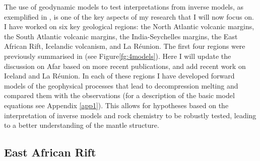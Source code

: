 The use of geodynamic models to test interpretations from inverse models, as exemplified in \cite{goes-etal-2012}, is one of the key aspects of my research that I will now focus on. I have worked on six key geological regions: the North Atlantic volcanic margins, the South Atlantic volcanic margins, the India-Seychelles margins, the East African Rift, Icelandic volcanism, and La Réunion. The first four regions were previously summarised in \cite{armitage-2018} (see Figure\ref{fg:4models}). Here I will update the discussion on Afar based on more recent publications, and add recent work on Iceland and La Réunion. In each of these regions I have developed forward models of the geophysical processes that lead to decompression melting and compared them with the observations (for a description of the basic model equations see Appendix \ref{app1}). This allows for hypotheses based on the interpretation of inverse models and rock chemistry to be robustly tested, leading to a better understanding of the mantle structure.

\subsection{East African Rift}

